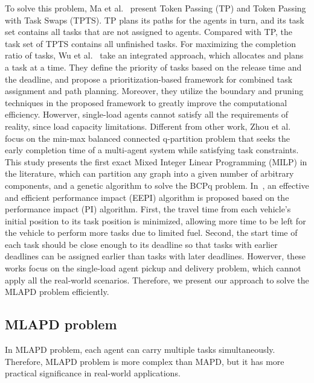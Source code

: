 \documentclass[sigconf,anonymous]{aamas}
\begin{document}
To solve this problem, 
Ma et al.~\cite{ma2017lifelong} present Token Passing (TP) 
and Token Passing with Task Swaps (TPTS). 
TP plans its paths for the agents in turn, 
and its task set contains all tasks that are not assigned to agents. 
Compared with TP, the task set of TPTS contains all unfinished tasks.
For maximizing the completion ratio of tasks,
Wu et al.~\cite{wu2021multi} take an integrated approach,
which allocates and plans a task at a time.
They define the priority of tasks based on the release time and the deadline,
and propose a prioritization-based framework for combined task assignment and path planning.
Moreover, they utilize the boundary and pruning techniques
in the proposed framework to greatly improve the computational efficiency.
Howerver, single-load agents cannot satisfy all the requirements of reality,
since load capacity limitations.
Different from other work,
Zhou et al.~\cite{zhou2019balanced} focus on the min-max balanced connected q-partition problem
that seeks the early completion time of a multi-agent system while satisfying task constraints.
This study presents the first exact Mixed Integer Linear Programming (MILP) in the literature,
which can partition any graph into a given number of arbitrary components,
and a genetic algorithm to solve the BCPq problem.
In~\cite{wang2023efficient}, 
an effective and efficient performance impact (EEPI) algorithm 
is proposed based on the performance impact (PI) algorithm. 
First, the travel time from each vehicle's initial position to its task position is minimized,
allowing more time to be left for the vehicle to perform more tasks due to limited fuel.
Second, the start time of each task should be close enough to its deadline 
so that tasks with earlier deadlines can be assigned earlier than tasks with later deadlines.
Howerver, these works focus on the single-load agent pickup and delivery problem,
which cannot apply all the real-world scenarios.
Therefore, we present our approach to solve the MLAPD problem efficiently.

\subsection{MLAPD problem}
\label{sec:MLAPD}
In MLAPD problem, each agent can carry multiple tasks simultaneously.
Therefore, MLAPD problem is more complex than MAPD,
but it has more practical significance in real-world applications.
\end{document}
